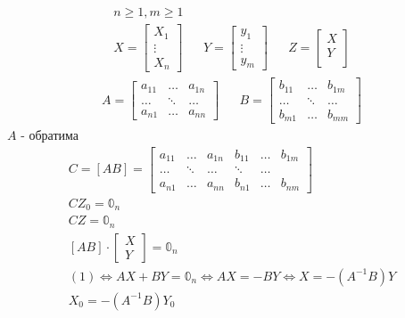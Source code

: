 \documentclass[main]{subfiles}
\begin{document}
      \begin{theorem}
         \begin{align*}
          n \geq 1, m \geq 1 \\
           X = \begin{bmatrix*}
            X_1 \\
            \vdots \\
            X_n
         \end{bmatrix*} &&  Y = \begin{bmatrix*}
            y_1 \\
            \vdots \\
            y_m
         \end{bmatrix*} &&
         Z = \begin{bmatrix*}
            X \\
            Y \\
         \end{bmatrix*} 
      \end{align*}
      \begin{align*}
         A = \begin{bmatrix*}
            a_{11} & \ldots & a_{1n} \\
            \ldots & \ddots & \ldots \\
            a_{n1} & \ldots & a_{nn}
         \end{bmatrix*} &&
         B = \begin{bmatrix*}
            b_{11} & \ldots & b_{1m} \\
            \ldots & \ddots & \ldots \\
            b_{m1} & \ldots & b_{mm}
         \end{bmatrix*} 
      \end{align*}
      $A$ - обратима
      \begin{gather*}
          C= [AB]  = \begin{bmatrix*}
            a_{11} & \ldots & a_{1n} & b_{11} & \ldots & b_{1m} \\
            \ldots & \ddots & \ldots & \ddots & \ldots \\
            a_{n1} & \ldots & a_{nn} & b_{n1} & \ldots & b_{nm}
         \end{bmatrix*} \\
       CZ_0 = \mathbb{0}_n \\
       CZ = \mathbb{0}_n \\
       [AB] \cdot \begin{bmatrix*}
         X \\
         Y
      \end{bmatrix*} = \mathbb{0}_n \tag{1} \\
      (1) \Leftrightarrow AX + BY = \mathbb{0}_n \Leftrightarrow AX = -BY \Leftrightarrow X
      = -(A^{-1}B)Y \tag{2}  \\
       X_0 = -(A^{-1}B)Y_0 \tag{2'} 
      \end{gather*}
      \end{theorem}
 
\end{document}
